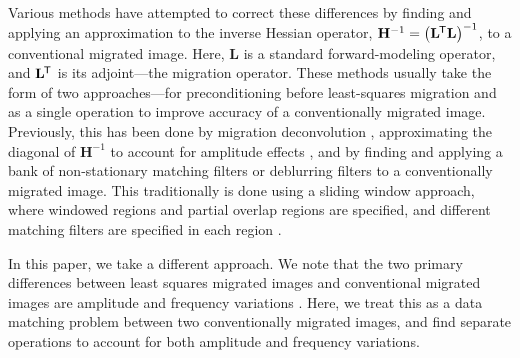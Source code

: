 Various methods have attempted to correct these differences by finding and applying an approximation to the inverse Hessian operator, $\mathbf{H}^{-1} = \left (\mathbf{L}^{\mkern-1.5mu\mathsf{T}}\mathbf{L} \right )^{-1}$, to a conventional migrated image.
Here, $\mathbf{L}$ is a standard forward-modeling operator, and $\mathbf{L}^{\mkern-1.5mu\mathsf{T}}$ is its adjoint---the migration operator.
These methods usually take the form of two approaches---for preconditioning before least-squares migration and as a single operation to improve accuracy of a conventionally migrated image.
Previously, this has been done by 
migration deconvolution \cite[]{poststack,prestack},
approximating the diagonal of $\mathbf{H}^{-1}$ to account for amplitude effects \cite[]{amp,diagamp},
and by finding and applying a bank of non-stationary matching filters \cite[]{imop,rtmmf} or deblurring filters \cite[]{debfilt} to a conventionally migrated image.
This traditionally is done using a sliding window approach, where windowed regions and partial overlap regions are specified, and different matching filters are specified in each region \cite[]{seiinv}.

In this paper, we take a different approach. 
We note that the two primary differences between least squares migrated images and conventional migrated images are amplitude and frequency variations \cite[]{Hou2015, Hou2016}. 
Here, we treat this as a data matching problem between two conventionally migrated images, and find separate operations to account for both amplitude and frequency variations.

